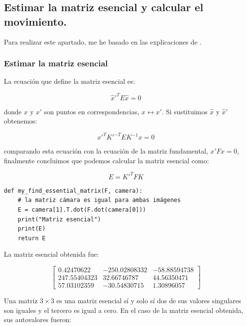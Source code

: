 \documentclass[11pt,a4paper]{article}
\theoremstyle{plain}
\theoremstyle{definition}
\begin{document}
\subsection{Estimar la matriz esencial y calcular el movimiento.}

Para realizar este apartado, me he basado en las explicaciones de \cite{mvg}.

\subsubsection{Estimar la matriz esencial}

La ecuación que define la matriz esencial es:

\begin{displaymath}
\hat{x}'^T E \hat{x} = 0
\end{displaymath}

donde $x$ y $x'$ son puntos en correspondencias, $x \leftrightarrow x'$.  Si sustituimos $\hat{x}$ y $\hat{x}'$ obtenemos:

\begin{displaymath}
x'^T K'^{-T} E K^{-1} x = 0
\end{displaymath}

comparando esta ecuación con la ecuación de la matriz fundamental, $x'Fx = 0$, finalmente concluimos que podemos calcular la matriz esencial como:

\begin{displaymath}
E = K'^T F K
\end{displaymath}

\begin{verbatim}
def my_find_essential_matrix(F, camera):
    # la matriz cámara es igual para ambas imágenes
    E = camera[1].T.dot(F.dot(camera[0]))
    print("Matriz esencial")
    print(E)
    return E
\end{verbatim}

La matriz esencial obtenida fue:

\begin{displaymath}
\left[
\begin{matrix}
0.42470622 & -250.02808332 & -58.88594738 \\
247.55404323 &   32.66746787 &  44.56350471 \\
57.03102359 &  -30.54830715 &   1.30896057 
\end{matrix}
\right]
\end{displaymath}

Una matriz $3 \times 3$ es una matriz esencial sí y solo sí dos de sus valores singulares son iguales y el tercero es igual a cero. En el caso de la matriz esencial obtenida, sus autovalores fueron:
\end{document}
